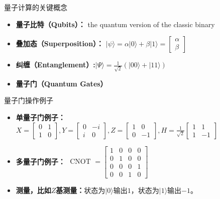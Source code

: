 \documentclass[aspectratio=1610]{ctexbeamer}
\begin{document}
\begin{frame}{量子计算的关键概念}
    \begin{itemize}
        \item \textbf{量子比特（Qubits）：} the quantum version of the classic binary
        \item \textbf{叠加态（Superposition）：} $|\psi\rangle = \alpha |0\rangle + \beta |1\rangle=\left[\begin{array}{r}\alpha \\\beta\end{array}\right]$
        \item \textbf{纠缠（Entanglement）:}$|\Psi\rangle = \frac{1}{\sqrt{2}}(|00\rangle+|11\rangle)$
        \item \textbf{量子门（Quantum Gates）} 
    \end{itemize}
\end{frame}
\begin{frame}{量子门操作例子}
    \begin{itemize}
        \item \textbf{单量子门例子：}$X=\left[\begin{array}{rr}0 & 1 \\1 & 0 \end{array}\right],Y=\left[\begin{array}{rr}0 & -i \\i & 0 \end{array}\right],Z=\left[\begin{array}{rr}1 & 0 \\0 & -1 \end{array}\right],H=\frac{1}{\sqrt{2}}\left[\begin{array}{rr}1 & 1 \\1 & -1 \end{array}\right]$ 
        \item \textbf{多量子门例子：} $\text { CNOT }=\left[\begin{array}{llll}
            1 & 0 & 0 & 0 \\
            0 & 1 & 0 & 0 \\
            0 & 0 & 0 & 1 \\
            0 & 0 & 1 & 0
            \end{array}\right]$
        \item \textbf{测量，比如$Z$基测量：}状态为$|0\rangle$输出$1$，状态为$|1\rangle$输出$-1$。
    \end{itemize}
\end{frame}
\end{document}
